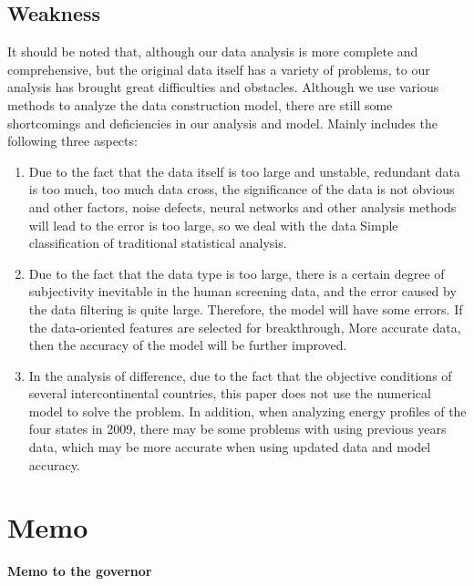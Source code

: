 \documentclass[a4paper]{article}
\begin{document}
\subsection{Weakness}

It should be noted that, although our data analysis is more complete and comprehensive, but the original data itself has a variety of problems, to our analysis has brought great difficulties and obstacles. Although we use various methods to analyze the data construction model, there are still some shortcomings and deficiencies in our analysis and model. Mainly includes the following three aspects:


\begin{enumerate}
\item  Due to the fact that the data itself is too large and unstable, redundant data is too much, too much data cross, the significance of the data is not obvious and other factors, noise defects, neural networks and other analysis methods will lead to the error is too large, so we deal with the data Simple classification of traditional statistical analysis.

\item Due to the fact that the data type is too large, there is a certain degree of subjectivity inevitable in the human screening data, and the error caused by the data filtering is quite large. Therefore, the model will have some errors. If the data-oriented features are selected for breakthrough, More accurate data, then the accuracy of the model will be further improved.


\item In the analysis of difference, due to the fact that the objective conditions of several intercontinental countries, this paper does not use the numerical model to solve the problem. In addition, when analyzing energy profiles of the four states in 2009, there may be some problems with using previous years data, which may be more accurate when using updated data and model accuracy.

\end{enumerate}





\newpage
\section{Memo}

\begin{center}
  \textbf{Memo to the governor}
\end{center}
\end{document}
